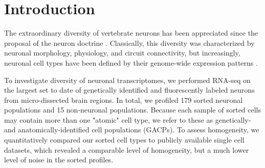 \section*{Introduction}

The extraordinary diversity of vertebrate neurons has been appreciated since the proposal of the neuron doctrine \citep{Cajal_1888}. Classically, this diversity was characterized by neuronal morphology, physiology, and circuit connectivity, but increasingly, neuronal cell types have been defined by their genome-wide expression patterns \citep{Sugino_2005,Doyle_2008}. 


To investigate diversity of neuronal transcriptomes, we performed RNA-seq on the largest set to date of genetically identified and fluorescently labeled neurons from micro-dissected brain regions. In total, we profiled 179 sorted neuronal populations and 15 non-neuronal populations. Because each sample of sorted cells may contain more than one "atomic" cell type, we refer to these as genetically- and anatomically-identified cell populations (GACPs). To assess  homogeneity, we quantitatively compared our sorted cell types to publicly available single cell datasets, which revealed a comparable level of homogeneity, but a much lower level of noise in the sorted profiles. 

